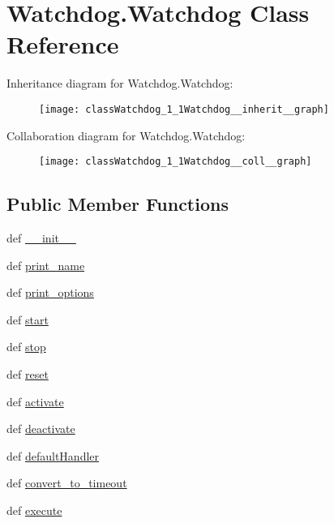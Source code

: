\hypertarget{classWatchdog_1_1Watchdog}{\section{Watchdog.\-Watchdog Class Reference}
\label{classWatchdog_1_1Watchdog}
}


Inheritance diagram for Watchdog.\-Watchdog\-:\nopagebreak
\begin{figure}[H]
\begin{center}
\leavevmode
\texttt{[image: classWatchdog\_1\_1Watchdog\_\_inherit\_\_graph]}
\end{center}
\end{figure}


Collaboration diagram for Watchdog.\-Watchdog\-:\nopagebreak
\begin{figure}[H]
\begin{center}
\leavevmode
\texttt{[image: classWatchdog\_1\_1Watchdog\_\_coll\_\_graph]}
\end{center}
\end{figure}
\subsection*{Public Member Functions}
\begin{DoxyCompactItemize}
\item 
def \hyperlink{classWatchdog_1_1Watchdog_aa1f4dbdbd309300a402765a051ec0a53}{\-\_\-\-\_\-init\-\_\-\-\_\-}
\item 
def \hyperlink{classWatchdog_1_1Watchdog_a9b6386067421696fd9ff0f3aea52c9a4}{print\-\_\-name}
\item 
def \hyperlink{classWatchdog_1_1Watchdog_a5368c099a18a43a367ca38191d7286f7}{print\-\_\-options}
\item 
def \hyperlink{classWatchdog_1_1Watchdog_a0ddb7a85fbdad4cff3af0fe3628098f7}{start}
\item 
def \hyperlink{classWatchdog_1_1Watchdog_af56d743f19894122322a238de2bb36c7}{stop}
\item 
def \hyperlink{classWatchdog_1_1Watchdog_ae4c28ad104e774e68874a3129762ae8c}{reset}
\item 
def \hyperlink{classWatchdog_1_1Watchdog_a3d832cad81328a1c259015e8c68c16d9}{activate}
\item 
def \hyperlink{classWatchdog_1_1Watchdog_a2d1d443fe10d34903950dabb8d54ca67}{deactivate}
\item 
def \hyperlink{classWatchdog_1_1Watchdog_ac8a0d09157f34dc021ffc0753750cfc9}{default\-Handler}
\item 
def \hyperlink{classWatchdog_1_1Watchdog_ad7d2edaf53bf4fa24061d88448fea058}{convert\-\_\-to\-\_\-timeout}
\item 
def \hyperlink{classWatchdog_1_1Watchdog_a2d051635bc61c3f75ea7c2fbeed426b5}{execute}
\end{DoxyCompactItemize}

